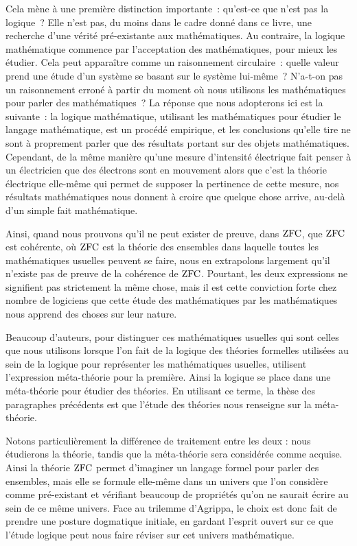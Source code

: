 Cela mène à une première distinction importante~: qu'est-ce que n'est pas la
logique~? Elle n'est pas, du moins dans le cadre donné dans ce livre, une
recherche d'une vérité pré-existante aux mathématiques. Au contraire, la logique
mathématique commence par l'acceptation des mathématiques, pour mieux les
étudier. Cela peut apparaître comme un raisonnement circulaire~: quelle valeur
prend une étude d'un système se basant sur le système lui-même~? N'a-t-on pas un
raisonnement erroné à partir du moment où nous utilisons les mathématiques pour
parler des mathématiques~? La réponse que nous adopterons ici est la suivante~:
la logique mathématique, utilisant les mathématiques pour étudier le langage
mathématique, est un procédé empirique, et les conclusions qu'elle tire ne sont
à proprement parler que des résultats portant sur des objets mathématiques.
Cependant, de la même manière qu'une mesure d'intensité électrique fait penser à
un électricien que des électrons sont en mouvement alors que c'est la théorie
électrique elle-même qui permet de supposer la pertinence de cette mesure, nos
résultats mathématiques nous donnent à croire que quelque chose arrive, au-delà
d'un simple fait mathématique.

Ainsi, quand nous prouvons qu'il ne peut exister de preuve, dans $\operatorname{ZFC}$, que
$\operatorname{ZFC}$ est cohérente, où $\operatorname{ZFC}$ est la théorie des ensembles dans laquelle
toutes les mathématiques usuelles peuvent se faire, nous en extrapolons
largement qu'il n'existe pas de preuve de la cohérence de $\operatorname{ZFC}$. Pourtant, les
deux expressions ne signifient pas strictement la même chose, mais il est cette
conviction forte chez nombre de logiciens que cette étude des mathématiques par
les mathématiques nous apprend des choses sur leur nature.

Beaucoup d'auteurs, pour distinguer ces mathématiques usuelles qui sont celles
que nous utilisons lorsque l'on fait de la logique des théories formelles
utilisées au sein de la logique pour représenter les mathématiques usuelles,
utilisent l'expression \og méta-théorie\fg{} pour la première. Ainsi la logique
se place dans une méta-théorie pour étudier des théories. En utilisant ce terme,
la thèse des paragraphes précédents est que l'étude des théories nous renseigne
sur la méta-théorie.

Notons particulièrement la différence de traitement entre les deux : nous
étudierons la théorie, tandis que la méta-théorie sera considérée comme acquise.
Ainsi la théorie $\operatorname{ZFC}$ permet d'imaginer un langage formel pour parler des
ensembles, mais elle se formule elle-même dans un univers que l'on considère
comme pré-existant et vérifiant beaucoup de propriétés qu'on ne saurait écrire
au sein de ce même univers. Face au trilemme d'Agrippa, le choix est donc fait
de prendre une posture dogmatique initiale, en gardant l'esprit ouvert sur ce
que l'étude logique peut nous faire réviser sur cet univers mathématique.

